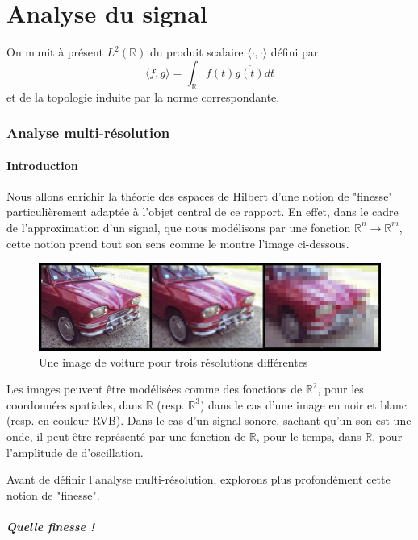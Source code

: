 \documentclass[]{article}
\theoremstyle{remark}
\theoremstyle{definition}
\begin{document}
	\part{Analyse du signal}
	
	On munit à présent $L^2(\mathbb{R})$ du produit scalaire $\langle \cdot, \cdot \rangle$ défini par $$\langle f, g\rangle = \int_\mathbb{R} f(t) \overline{g(t)} dt$$
	et de la topologie induite par la norme correspondante.
	
	\section{Analyse multi-résolution}
	
	\subsection{Introduction}
	
	Nous allons enrichir la théorie des espaces de Hilbert d'une notion de "finesse"  particulièrement adaptée à l'objet central de ce rapport. En effet, dans le cadre de l'approximation d'un signal, que nous modélisons par une fonction $\mathbb{R}^n \rightarrow \mathbb{R}^m$, cette notion prend tout son sens comme le montre l'image ci-dessous.
	
	\begin{figure}[h]
		\centering
		\includegraphics[width=350pt]{Resolution_wikipedia.jpg}
		\caption{Une image de voiture pour trois résolutions différentes}
	\end{figure}
	
	Les images peuvent être modélisées comme des fonctions de $\mathbb{R}^2$, pour les coordonnées spatiales, dans $\mathbb{R}$ (resp. $\mathbb{R}^3$) dans le cas d'une image en noir et blanc (resp. en couleur RVB). Dans le cas d'un signal sonore, sachant qu'un son est une onde, il peut être représenté par une fonction de $\mathbb{R}$, pour le temps, dans $\mathbb{R}$, pour l'amplitude de d'oscillation.
	
	Avant de définir l'analyse multi-résolution, explorons plus profondément cette notion de "finesse".
	
	\subsubsection*{Quelle finesse !}
	
\end{document}
